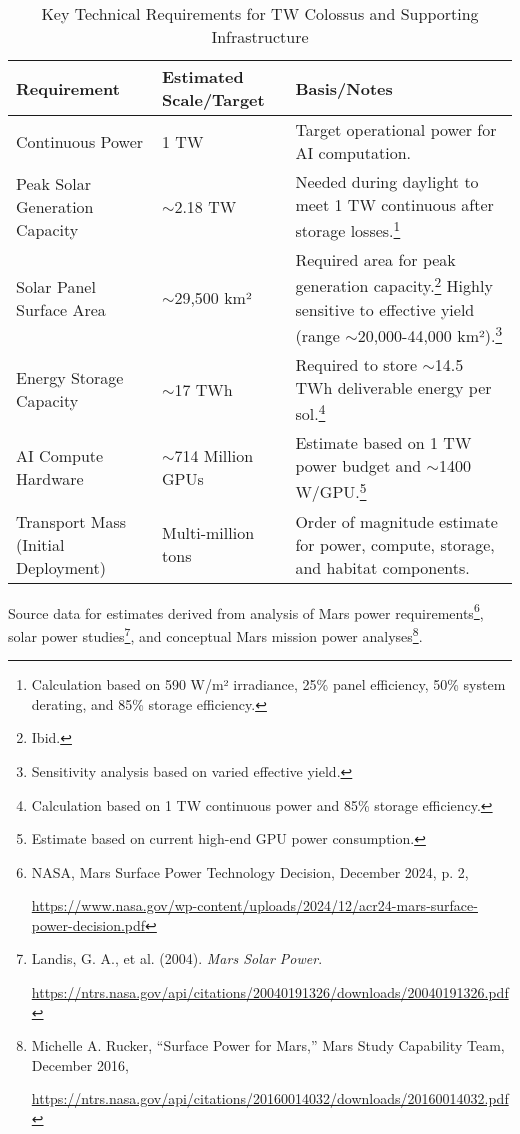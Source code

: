 \documentclass[fontsize=10pt, oneside, DIV=calc]{scrartcl}
\begin{document}
\begin{table}[htbp]
\centering
\caption{Key Technical Requirements for TW Colossus and Supporting Infrastructure}
\begin{tabularx}{\textwidth}{|X|X|X|}
\hline
\textbf{Requirement} & \textbf{Estimated Scale/Target} & \textbf{Basis/Notes} \\ \hline
Continuous Power & 1 TW & Target operational power for AI computation. \\ \hline
Peak Solar Generation Capacity & $\sim$2.18 TW & Needed during daylight to meet 1 TW continuous after storage losses.\footnote{Calculation based on 590 W/m² irradiance, 25\% panel efficiency, 50\% system derating, and 85\% storage efficiency.} \\ \hline
Solar Panel Surface Area & $\sim$29,500 km² & Required area for peak generation capacity.\footnote{Ibid.} Highly sensitive to effective yield (range $\sim$20,000-44,000 km²).\footnote{Sensitivity analysis based on varied effective yield.} \\ \hline
Energy Storage Capacity & $\sim$17 TWh & Required to store $\sim$14.5 TWh deliverable energy per sol.\footnote{Calculation based on 1 TW continuous power and 85\% storage efficiency.} \\ \hline
AI Compute Hardware & $\sim$714 Million GPUs & Estimate based on 1 TW power budget and $\sim$1400 W/GPU.\footnote{Estimate based on current high-end GPU power consumption.} \\ \hline
Transport Mass (Initial Deployment) & Multi-million tons & Order of magnitude estimate for power, compute, storage, and habitat components. \\ \hline
\end{tabularx}
\end{table}

\noindent\footnotesize
Source data for estimates derived from analysis of Mars power requirements\footnote{NASA, Mars Surface Power Technology Decision, December 2024, p. 2,








\href{https://www.nasa.gov/wp-content/uploads/2024/12/acr24-mars-surface-power-decision.pdf}\url{https://www.nasa.gov/wp-content/uploads/2024/12/acr24-mars-surface-power-decision.pdf}}, solar power studies\footnote{Landis, G. A., et al. (2004). \textit{Mars Solar Power}.








\href{https://ntrs.nasa.gov/api/citations/20040191326/downloads/20040191326.pdf}\url{https://ntrs.nasa.gov/api/citations/20040191326/downloads/20040191326.pdf}}, and conceptual Mars mission power analyses\footnote{Michelle A. Rucker, ``Surface Power for Mars,'' Mars Study Capability Team, December 2016,








\href{https://ntrs.nasa.gov/api/citations/20160014032/downloads/20160014032.pdf}\url{https://ntrs.nasa.gov/api/citations/20160014032/downloads/20160014032.pdf}}.
\end{document}
